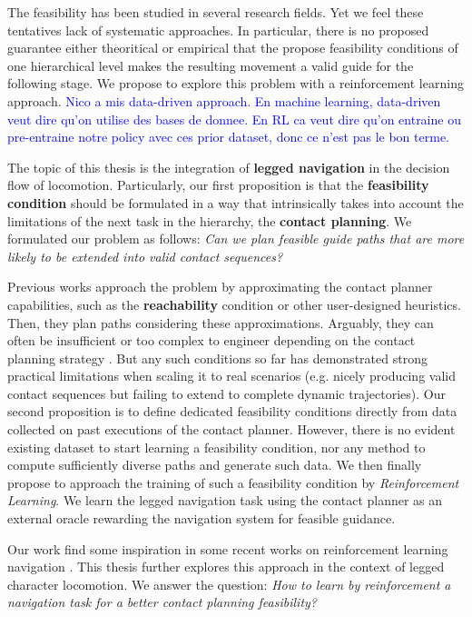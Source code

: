The feasibility has been studied in several research fields. Yet we feel these tentatives lack of systematic approaches.
In particular, there is no proposed guarantee either theoritical or empirical that the propose feasibility conditions of one hierarchical level makes the resulting movement a valid guide for the following stage.
We propose to explore this problem with a reinforcement learning approach.
\textcolor{blue}{Nico a mis data-driven approach. En machine learning, data-driven veut dire qu'on utilise des bases de donnee. En RL ca veut dire qu'on entraine ou pre-entraine notre policy avec ces prior dataset, donc ce n'est pas le bon terme.}
\hfill \break
\hfill \break

The topic of this thesis is the integration of \textbf{legged navigation} in the decision flow of locomotion. Particularly, our first proposition is that the \textbf{feasibility condition} should be formulated in a way that intrinsically takes into account the limitations of the next task in the hierarchy, the \textbf{contact planning}.
We formulated our problem as follows: \textit{Can we plan feasible guide paths that are more likely to be extended into valid contact sequences?}

Previous works approach the problem by approximating the contact planner capabilities, such as the \textbf{reachability} condition \cite{RB-PRM} or other user-designed heuristics.
Then, they plan paths considering these approximations.
Arguably, they can often be insufficient or too complex to engineer depending on the contact planning strategy \cite{AcyclicCP, winkler_2014}.
But any such conditions so far has demonstrated strong practical limitations when scaling it to real scenarios (e.g. nicely producing valid contact sequences but failing to extend to complete dynamic trajectories). 
Our second proposition is to define dedicated feasibility conditions directly from data collected on past executions of the contact planner.
However, there is no evident existing dataset to start learning a feasibility condition, nor any method to compute sufficiently diverse paths and generate such data.
We then finally propose to approach the training of such a feasibility condition by \textit{Reinforcement Learning}. We learn the legged navigation task using the contact planner as an external oracle rewarding the navigation system for feasible guidance.

Our work find some inspiration in some recent works on reinforcement learning navigation \cite{prm_rl_2019, jaedong_2018_crowd_rl}. 
This thesis further explores this approach in the context of legged character locomotion.
We answer the question: \textit{How to learn by reinforcement a navigation task for a better contact planning feasibility?}

